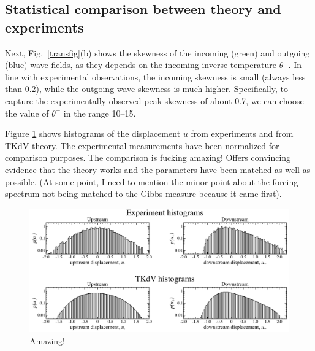\documentclass[11pt]{article}
\newcommand{\thup}{\theta^{-}}
\begin{document}
\subsection{Statistical comparison between theory and experiments}

Next, Fig.~\ref{transfig}(b) shows the skewness of the incoming (green) and outgoing (blue) wave fields, as they depends on the incoming inverse temperature $\thup$. In line with experimental observations, the incoming skewness is small (always less than 0.2), while the outgoing wave skewness is much higher. Specifically, to capture the experimentally observed peak skewness of about 0.7, we can choose the value of $\thup$ in the range 10--15.

Figure \ref{uhist} shows histograms of the displacement $u$ from experiments and from TKdV theory. The experimental measurements have been normalized for comparison purposes. The comparison is fucking amazing! Offers convincing evidence that the theory works and the parameters have been matched as well as possible. (At some point, I need to mention the minor point about the forcing spectrum not being matched to the Gibbs measure because it came first).

\begin{figure}%
\begin{center}
\includegraphics[width = 0.99 \linewidth]{Figs/uhist.pdf}
\caption{
Amazing!
}
\label{uhist}
\end{center}
\end{figure}
\end{document}
